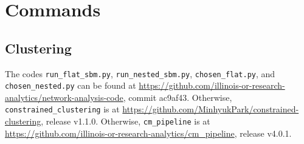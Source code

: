 \documentclass[aps,pre,superscriptaddress]{article}
\begin{document}
\section{Commands}

\subsection{Clustering}
\label{command-cluster}

The codes \verb+run_flat_sbm.py+, \verb+run_nested_sbm.py+, \verb+chosen_flat.py+, and \verb+chosen_nested.py+ can be found at \url{https://github.com/illinois-or-research-analytics/network-analysis-code}, commit ac9af43.
Otherwise, \verb+constrained_clustering+ is at \url{https://github.com/MinhyukPark/constrained-clustering}, release v1.1.0.
Otherwise, \verb+cm_pipeline+ is at \url{https://github.com/illinois-or-research-analytics/cm_pipeline}, release v4.0.1.
\end{document}
